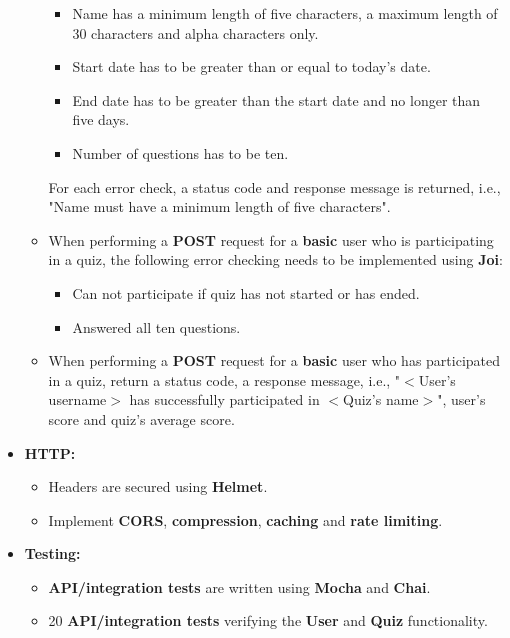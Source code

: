 \documentclass{article}
\begin{document}
\begin{itemize}
\begin{itemize}
		\begin{itemize}
			\item Name has a minimum length of five characters, a maximum length of 30 characters and alpha characters only.
			\item Start date has to be greater than or equal to today's date.
			\item End date has to be greater than the start date and no longer than five days. 
			\item Number of questions has to be ten.
		\end{itemize}
		For each error check, a status code and response message is returned, i.e., "Name must have a minimum length of five characters".
		\item When performing a \textbf{POST} request for a \textbf{basic} user who is participating in a quiz, the following error checking needs to be implemented using \textbf{Joi}:
		\begin{itemize}
			\item Can not participate if quiz has not started or has ended.
			\item Answered all ten questions.
		\end{itemize}
		\item When performing a \textbf{POST} request for a \textbf{basic} user who has participated in a quiz, return a status code, a response message, i.e., "$<$User's username$>$ has successfully participated in $<$Quiz's name$>$", user's score and quiz's average score.
	\end{itemize}
	
	\item \textbf{HTTP:}
	\begin{itemize}
		\item Headers are secured using \textbf{Helmet}.
		\item Implement \textbf{CORS}, \textbf{compression}, \textbf{caching} and \textbf{rate limiting}.
	\end{itemize}
	
	\item \textbf{Testing:}
	\begin{itemize}
		\item \textbf{API/integration tests} are written using \textbf{Mocha} and \textbf{Chai}.
		\item 20 \textbf{API/integration tests} verifying the \textbf{User} and \textbf{Quiz} functionality.
	\end{itemize}


\end{itemize}
\end{document}
